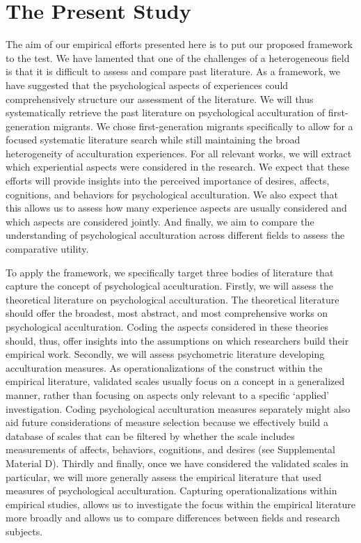 \documentclass[man, 12pt, a4paper, mask]{apa7}
\newcommand\Warning[1][2ex]{%
  \renewcommand\stacktype{L}%
  \scaleto{\stackon[1.3pt]{\color{red}$\triangle$}{\tiny\bfseries !}}{#1}}%
\begin{document}
\section{The Present Study}


The aim of our empirical efforts presented here is to put our proposed framework to the test. We have lamented that one of the challenges of a heterogeneous field is that it is difficult to assess and compare past literature. As a framework, we have suggested that the psychological aspects of experiences could comprehensively structure our assessment of the literature. We will thus systematically retrieve the past literature on psychological acculturation of first-generation migrants. We chose first-generation migrants specifically to allow for a focused systematic literature search while still maintaining the broad heterogeneity of acculturation experiences. For all relevant works, we will extract which experiential aspects were considered in the research. We expect that these efforts will provide insights into the perceived importance of desires, affects, cognitions, and behaviors for psychological acculturation. We also expect that this allows us to assess how many experience aspects are usually considered and which aspects are considered jointly. And finally, we aim to compare the understanding of psychological acculturation across different fields to assess the comparative utility. 

To apply the framework, we specifically target three bodies of literature that capture the concept of psychological acculturation. Firstly, we will assess the theoretical literature on psychological acculturation. The theoretical literature should offer the broadest, most abstract, and most comprehensive works on psychological acculturation. Coding the aspects considered in these theories should, thus, offer insights into the assumptions on which researchers build their empirical work.
Secondly, we will assess psychometric literature developing acculturation measures. As operationalizations of the construct within the empirical literature, validated scales usually focus on a concept in a generalized manner, rather than focusing on aspects only relevant to a specific `applied' investigation. Coding psychological acculturation measures separately might also aid future considerations of measure selection because we effectively build a database of scales that can be filtered by whether the scale includes measurements of affects, behaviors, cognitions, and desires (see Supplemental Material D). 
Thirdly and finally, once we have considered the validated scales in particular, we will more generally assess the empirical literature that used measures of psychological acculturation. Capturing operationalizations within empirical studies, allows us to investigate the focus within the empirical literature more broadly and allows us to compare differences between fields and research subjects.
\end{document}
